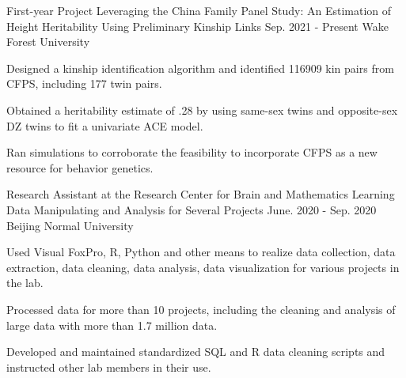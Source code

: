 \begin{cventries}
    \cventry
    {First-year Project} %
    {Leveraging the China Family Panel Study: An Estimation of Height Heritability Using Preliminary Kinship Links} %
    {Sep. 2021 - Present} %
    {Wake Forest University} %
    {
      \begin{cvitems} %
        \item {Designed a kinship identification algorithm and identified 116909 kin pairs from CFPS, including 177 twin pairs.}
        \item {Obtained a heritability estimate of .28 by using same-sex twins and opposite-sex DZ twins to fit a univariate ACE model.}
        \item {Ran simulations to corroborate the feasibility to incorporate CFPS as a new resource for behavior genetics.}
      \end{cvitems}
    }
    
  \cventry
    {Research Assistant at the Research Center for Brain and Mathematics Learning} %
    {Data Manipulating and Analysis for Several Projects} %
    {June. 2020 - Sep. 2020} %
    {Beijing Normal University } %
    {
      \begin{cvitems} %
        \item {Used Visual FoxPro, R, Python and other means to realize data collection, data extraction, data cleaning, data analysis, data visualization for various projects in the lab. }
        \item {Processed data for more than 10 projects, including the cleaning and analysis of large data with more than 1.7 million data.}
        \item {Developed and maintained standardized SQL and R data cleaning scripts and instructed other lab members in their use.}
      \end{cvitems}
    }
    

\end{cventries}
